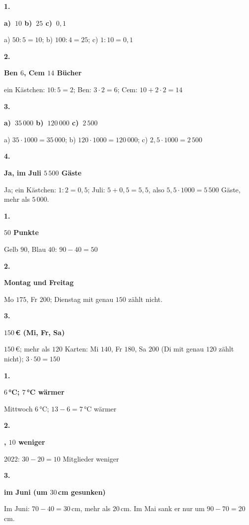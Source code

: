 \documentclass[11pt]{article}
\newcommand{\lsg}[3]{\par\noindent\begin{minipage}[t]{9mm}\textbf{#1}\end{minipage}%
  \begin{minipage}[t]{52mm}\raggedright\bfseries\boldmath #2\end{minipage}\hspace{3mm}%
  \begin{minipage}[t]{\dimexpr\linewidth-64mm\relax}\raggedright\small #3\end{minipage}\par\vspace{4pt}}
\begin{document}
\par\smallskip
{}\par
\par\Needspace{25mm}\vspace{6pt}\noindent\colorbox{black!12}{}\hspace{2mm}{\bfseries Säulen ablesen}\par\vspace{4pt}
\lsg{1.}{\mbox{a) $10$} \mbox{b) $25$} \mbox{c) $0{,}1$}}{a) $50 : 5 = 10$; b) $100 : 4 = 25$; c) $1 : 10 = 0{,}1$}
\lsg{2.}{Ben $6$, Cem $14$ Bücher}{ein Kästchen: $10 : 5 = 2$; Ben: $3 \cdot 2 = 6$; Cem: $10 + 2 \cdot 2 = 14$}
\lsg{3.}{\mbox{a) $35\,000$} \mbox{b) $120\,000$} \mbox{c) $2\,500$}}{a) $35 \cdot 1000 = 35\,000$; b) $120 \cdot 1000 = 120\,000$; c) $2{,}5 \cdot 1000 = 2\,500$}
\lsg{4.}{Ja, im Juli $5\,500$ Gäste}{Ja; ein Kästchen: $1 : 2 = 0{,}5$; Juli: $5 + 0{,}5 = 5{,}5$, also $5{,}5 \cdot 1000 = 5\,500$ Gäste, mehr als $5\,000$.}
\par\Needspace{25mm}\vspace{6pt}\noindent\colorbox{black!12}{}\hspace{2mm}{\bfseries Werte vergleichen und auswählen}\par\vspace{4pt}
\lsg{1.}{$50$ Punkte}{Gelb $90$, Blau $40$: $90 - 40 = 50$}
\lsg{2.}{Montag und Freitag}{Mo $175$, Fr $200$; Dienstag mit genau $150$ zählt nicht.}
\lsg{3.}{$150$\,€ (Mi, Fr, Sa)}{$150$\,€; mehr als $120$ Karten: Mi $140$, Fr $180$, Sa $200$ (Di mit genau $120$ zählt nicht); $3 \cdot 50 = 150$}
\par\Needspace{25mm}\vspace{6pt}\noindent\colorbox{black!12}{}\hspace{2mm}{\bfseries Liniendiagramme lesen}\par\vspace{4pt}
\lsg{1.}{$6$\,°C; $7$\,°C wärmer}{Mittwoch $6$\,°C; $13 - 6 = 7$\,°C wärmer}
\lsg{2.}{2022, $10$ weniger}{2022: $30 - 20 = 10$ Mitglieder weniger}
\lsg{3.}{im Juni (um $30$\,cm gesunken)}{Im Juni: $70 - 40 = 30$\,cm, mehr als $20$\,cm. Im Mai sank er nur um $90 - 70 = 20$\,cm.}
\par\Needspace{25mm}\vspace{6pt}\noindent\colorbox{black!12}{}\hspace{2mm}{\bfseries Säulen zeichnen und Achse einteilen}\par\vspace{4pt}
\end{document}
